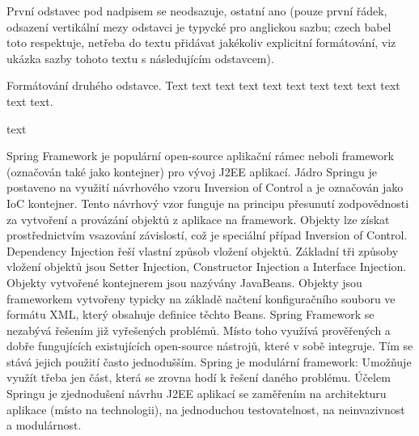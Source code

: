 
První odstavec pod nadpisem se neodsazuje, ostatní ano (pouze první řádek, odsazení vertikální mezy odstavci je typycké pro anglickou sazbu; czech babel toto respektuje, netřeba do textu přidávat jakékoliv explicitní formátování, viz ukázka sazby tohoto textu s následujícím odstavcem).

Formátování druhého odstavce. Text text text text text text text text text text text text.



text

Spring Framework je populární open-source aplikační rámec neboli framework (označován také jako kontejner) pro vývoj J2EE aplikací. Jádro Springu je postaveno na využití návrhového vzoru Inversion of Control a je označován jako IoC kontejner. Tento návrhový vzor funguje na principu přesunutí zodpovědnosti za vytvoření a provázání objektů z aplikace na framework. Objekty lze získat prostřednictvím vsazování závislostí, což je speciální případ Inversion of Control. Dependency Injection řeší vlastní způsob vložení objektů. Základní tři způsoby vložení objektů jsou Setter Injection, Constructor Injection a Interface Injection. Objekty vytvořené kontejnerem jsou nazývány JavaBeans. Objekty jsou frameworkem vytvořeny typicky na základě načtení konfiguračního souboru ve formátu XML, který obsahuje definice těchto Beans. Spring Framework se nezabývá řešením již vyřešených problémů. Místo toho využívá prověřených a dobře fungujících existujících open-source nástrojů, které v sobě integruje. Tím se stává jejich použití často jednodušším. Spring je modulární framework: Umožňuje využít třeba jen část, která se zrovna hodí k řešení daného problému. Účelem Springu je zjednodušení návrhu J2EE aplikací se zaměřením na architekturu aplikace (místo na technologii), na jednoduchou testovatelnost, na neinvazivnost a modulárnost.

